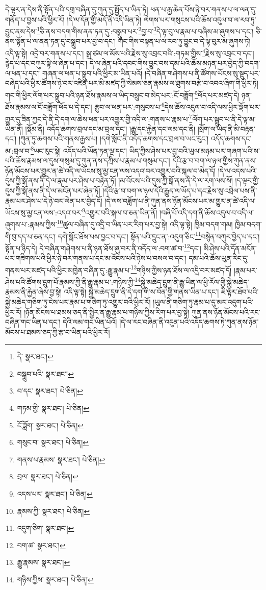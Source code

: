 དེ་ལྟར་ན་དེས་ནི་སྟོན་པའི་དགྲ་བཞིན་དུ་ཀུན་དུ་སྤྱོད་པ་ཡིན་ཏེ། ཕན་པ་རྒྱ་ཆེན་པོས་ཉེ་བར་གནས་པ་ལ་ལན་དུ་གནོད་པ་བྱས་པའི་ཕྱིར་རོ། །དེ་ལ་དོན་གྱི་མདོ་ནི་འདི་ཡིན་ཏེ། ལེགས་པར་གསུངས་པའི་ཆོས་འདུལ་བ་ལ་རབ་ཏུ་བྱུང་ནས་དེས་\footnote{དེ་  སྣར་ཐང་། }ཅི་ནས་བདག་གིས་ནན་ཏན་དུ་:བསྒྲུབ་པར་\footnote{བསྒྲུབ་པའི་  སྣར་ཐང་། }བྱ་བ་\footnote{བ་དང་  སྣར་ཐང་།  པེ་ཅིན། }དེ་ལྟ་བུ་ལ་རྣམ་པ་བཞིས་མ་ཞུགས་པ་དང་། ཅི་ནས་སྟོན་པ་ལ་ནན་ཏན་དུ་བསྒྲུབ་པར་བྱ་བ་དང་། གང་གིས་བསྟན་པ་ལ་རབ་ཏུ་བྱུང་བ་དེ་ལྟ་བུར་མ་ཞུགས་ཏེ། འདི་ལྟ་སྟེ། འདྲེ་བར་གནས་པ་དང་། སྒྲ་ཙམ་ལ་མོས་པའི་རྗེས་སུ་འབྲང་བའི་:གཏམ་གྱིས་\footnote{གཏམ་གྱི་  སྣར་ཐང་།  པེ་ཅིན། }རྗེས་སུ་འབྲང་བ་དང་། རྙེད་པ་དང་བཀུར་སྟི་ལ་ཞེན་པ་དང་། དེ་ལ་ཞེན་པའི་དབང་གིས་བྱུང་བས་དམ་པའི་ཆོས་མཉན་པར་བྱེད་ཀྱི་བདག་ལ་ཕན་པ་དང་། གཞན་ལ་ཕན་པ་སྒྲུབ་པའི་ཕྱིར་མ་ཡིན་པའོ། །དེ་བཞིན་གཤེགས་པ་ནི་ཚོགས་ཡོངས་སུ་སྡུད་པར་བཞེད་པའི་ཕྱིར་ཚོགས་ཉེ་བར་འཛིན་པར་མི་མཛད་ཀྱི་སེམས་ཅན་རྣམས་ལ་ཐུགས་བརྩེ་བ་འབའ་ཞིག་གི་ཕྱིར་ཏེ། གང་གི་ཕྱིར་ལོག་པར་སྒྲུབ་པའི་ཉན་ཐོས་རྣམས་ལ་ཡིད་བསྲུང་བ་མེད་པར་:ངོ་བཟློག་\footnote{ངོ་ཟློག་  སྣར་ཐང་།  པེ་ཅིན། }ཕོད་པར་མཛད་དེ། ཉན་ཐོས་རྣམས་ལ་ངོ་བཟློག་ཕོད་པ་དེ་དང་། རྩུབ་ལ་ཕན་པར་:གསུངས་པ་\footnote{གསུང་བ་  སྣར་ཐང་།  པེ་ཅིན། }དེས་ཆོས་འདུལ་བ་འདི་ལས་ཕྱིར་ལྡོག་པར་གྱུར་དུ་ཟིན་ཀྱང་དེ་ནི་དེ་དག་ལ་ཆེས་ཕན་པར་འགྱུར་གྱི་འདི་ལ་:གནས་པ་རྣམ་པ་\footnote{གནས་པ་རྣམས་  སྣར་ཐང་།  པེ་ཅིན། }ལོག་པར་སྒྲུབ་པ་ནི་དེ་ལྟ་མ་ཡིན་ནོ། །སྡོམ་ནི། འདོད་ཆགས་བྲལ་དང་མ་བྲལ་དང་། །རྒྱུ་དང་རྐྱེན་དང་ལམ་དང་ནི། །སྲོག་ལ་ཡིད་ནི་མི་བརྟན་དང་། །ཀུན་ཏུ་ཆགས་པའི་གནས་རྒྱས་པ། །དགེ་སློང་ནི་འདོད་ཆགས་དང་བྲལ་བ་ཡང་རུང་། འདོད་ཆགས་དང་མ་:བྲལ་བ་\footnote{བྲལ་  སྣར་ཐང་།  པེ་ཅིན། }ཡང་རུང་སྟེ། འདོད་པའི་ཡོན་ཏན་ལྔ་དང་། ཡིད་ཀྱིས་ཤེས་པར་བྱ་བའི་ཡུལ་མཉམ་པར་གཞག་པའི་ས་པའི་ཆོས་རྣམས་ལ་དུས་གསུམ་དུ་ཀུན་ནས་དཀྲིས་པ་རྣམ་པ་གསུམ་དང་། དེའི་རྩ་བ་བག་ལ་ཉལ་གྱིས་ཀུན་ནས་ཉོན་མོངས་པར་གྱུར་ན་ཚེ་འདི་ལ་ཡོངས་སུ་མྱ་ངན་ལས་འདའ་བར་འགྱུར་བའི་སྐལ་བ་མེད་དོ། །དེ་ལ་འདས་པའི་དུས་ཀྱི་སྒོ་ནས་ནི་དེ་ལ་རྣམ་པར་ཤེས་པ་བརྟེན་ཏོ། །མ་འོངས་པའི་དུས་ཀྱི་སྒོ་ནས་ནི་དེ་ལ་རག་ལས་སོ། །ད་ལྟར་གྱི་དུས་ཀྱི་སྒོ་ནས་ནི་དེ་ལ་མངོན་པར་ཞེན་ཏོ། །དེའི་རྩ་བ་བག་ལ་ཉལ་དེའི་རྒྱུད་ལ་ཡོད་པ་དང་རྗེས་སུ་འབྲེལ་པས་ནི་རྣམ་པར་ཤེས་པ་དེ་ཉེ་བར་ལེན་པར་བྱེད་དོ། །དེ་ལས་བཟློག་པ་ནི་ཀུན་ནས་ཉོན་མོངས་པར་མ་གྱུར་ན་ཚེ་འདི་ལ་ཡོངས་སུ་མྱ་ངན་ལས་:འདའ་བར་\footnote{འདས་པར་  སྣར་ཐང་།  པེ་ཅིན། }འགྱུར་བའི་སྐལ་བ་ཅན་ཡིན་ནོ། །བཞི་པོ་འདི་དག་ནི་ཆོས་འདུལ་བ་འདི་ལ་ཞུགས་པ་:རྣམས་ཀྱིས་\footnote{རྣམས་ཀྱི་  སྣར་ཐང་།  པེ་ཅིན། }ཚུལ་བཞིན་དུ་འདྲི་བ་ཡིན་པར་རིག་པར་བྱ་སྟེ། འདི་ལྟ་སྟེ། ཁྱིམ་བདག་གམ། ཁྱིམ་བདག་གི་བུ་དད་པ་ཅན་དང་། དགེ་སློང་ཐོས་པས་བྱང་བ་དང་། སྟོན་པའི་དྲུང་ན་:འདུག་ཅིང་\footnote{འདུག་ཅིག་  སྣར་ཐང་། }བསྙེན་བཀུར་བྱེད་པ་དང་། སྟོན་པ་ཉིད་དེ། དེ་བཞིན་གཤེགས་པ་ནི་ཉན་ཐོས་ཞུ་བར་ནི་འདོད་ལ་:བག་ཚ་བ་\footnote{བག་ཚ་  སྣར་ཐང་། }དང་། མི་ཤེས་པའི་དོན་མངོན་པར་གཟིགས་པའི་ཕྱིར་ཉེ་བར་གནས་པ་དང་མ་འོངས་པའི་ཉེས་པ་བསལ་བ་དང་། དམ་པའི་ཆོས་ཡུན་རིང་དུ་གནས་པར་མཛད་པའི་ཕྱིར་མཁྱེན་བཞིན་དུ་:རྒྱུ་རྣམ་པ་\footnote{རྒྱུ་རྣམས་  སྣར་ཐང་། }གཉིས་ཀྱིས་ཉན་ཐོས་ལ་འདྲི་བར་མཛད་དོ། །རྣམ་པར་ཤེས་པའི་ཚོགས་དྲུག་པོ་རྣམས་ཀྱི་ནི་རྒྱུ་རྣམ་པ་:གཉིས་ཀྱི་\footnote{གཉིས་ཀྱིས་  སྣར་ཐང་།  པེ་ཅིན། }སྐྱེ་མཆེད་དྲུག་ནི་རྒྱུ་ཡིན་ལ་ཕྱི་རོལ་གྱི་སྐྱེ་མཆེད་རྣམས་ནི་རྐྱེན་ཞེས་བྱ་སྟེ། འདི་ལྟ་སྟེ། སྐྱེ་མཆེད་དྲུག་ནི་དེ་དག་གི་ས་བོན་གྱི་གནས་ཡིན་པ་དང་། ཇི་ལྟར་ཐོབ་པའི་སྐྱེ་མཆེད་གཅིག་ཏུ་ངེས་པར་རྣམ་པ་གཅིག་ཏུ་འགྱུར་བའི་ཕྱིར་རོ། །ཡུལ་ནི་གཅིག་ཏུ་རྣམ་པ་དུ་མར་འདུག་པའི་ཕྱིར་རོ། །ཉོན་མོངས་པ་ཐམས་ཅད་ནི་སྤྱིར་ན་རྒྱུ་རྣམ་པ་གཉིས་ཀྱིས་རིག་པར་བྱ་སྟེ། ཀུན་ནས་ཉོན་མོངས་པའི་རང་བཞིན་གང་ཡིན་པ་དང་། དེའི་ལམ་གང་ཡིན་པའོ། །དེ་ལ་རང་བཞིན་ནི་འདུན་པའི་འདོད་ཆགས་ཏེ་ཀུན་ནས་ཉོན་མོངས་པ་ཐམས་ཅད་ཀྱི་རྩ་བ་ཡིན་པའི་ཕྱིར་རོ། 